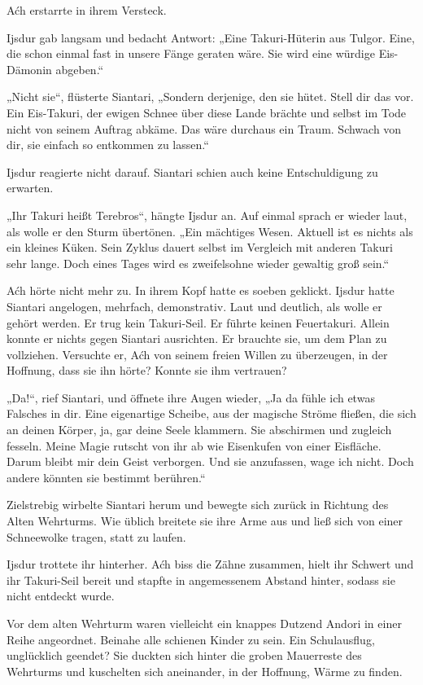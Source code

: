 Aćh erstarrte in ihrem Versteck.

Ijsdur gab langsam und bedacht Antwort: „Eine Takuri-Hüterin aus Tulgor. Eine, die schon einmal fast in unsere Fänge geraten wäre. Sie wird eine würdige Eis-Dämonin abgeben.“

„Nicht sie“, flüsterte Siantari, „Sondern derjenige, den sie hütet. Stell dir das vor. Ein Eis-Takuri, der ewigen Schnee über diese Lande brächte und selbst im Tode nicht von seinem Auftrag abkäme. Das wäre durchaus ein Traum. Schwach von dir, sie einfach so entkommen zu lassen.“

Ijsdur reagierte nicht darauf. Siantari schien auch keine Entschuldigung zu erwarten.

„Ihr Takuri heißt Terebros“, hängte Ijsdur an. Auf einmal sprach er wieder laut, als wolle er den Sturm übertönen. „Ein mächtiges Wesen. Aktuell ist es nichts als ein kleines Küken. Sein Zyklus dauert selbst im Vergleich mit anderen Takuri sehr lange. Doch eines Tages wird es zweifelsohne wieder gewaltig groß sein.“

Aćh hörte nicht mehr zu. In ihrem Kopf hatte es soeben geklickt. Ijsdur hatte Siantari angelogen, mehrfach, demonstrativ. Laut und deutlich, als wolle er gehört werden. Er trug kein Takuri-Seil. Er führte keinen Feuertakuri. Allein konnte er nichts gegen Siantari ausrichten. Er brauchte sie, um dem Plan zu vollziehen. Versuchte er, Aćh von seinem freien Willen zu überzeugen, in der Hoffnung, dass sie ihn hörte? Konnte sie ihm vertrauen?

„Da!“, rief Siantari, und öffnete ihre Augen wieder, „Ja da fühle ich etwas Falsches in dir. Eine eigenartige Scheibe, aus der magische Ströme fließen, die sich an deinen Körper, ja, gar deine Seele klammern. Sie abschirmen und zugleich fesseln. Meine Magie rutscht von ihr ab wie Eisenkufen von einer Eisfläche. Darum bleibt mir dein Geist verborgen. Und sie anzufassen, wage ich nicht. Doch andere könnten sie bestimmt berühren.“

Zielstrebig wirbelte Siantari herum und bewegte sich zurück in Richtung des Alten Wehrturms. Wie üblich breitete sie ihre Arme aus und ließ sich von einer Schneewolke tragen, statt zu laufen.

Ijsdur trottete ihr hinterher. Aćh biss die Zähne zusammen, hielt ihr Schwert und ihr Takuri-Seil bereit und stapfte in angemessenem Abstand hinter, sodass sie nicht entdeckt wurde.

Vor dem alten Wehrturm waren vielleicht ein knappes Dutzend Andori in einer Reihe angeordnet. Beinahe alle schienen Kinder zu sein. Ein Schulausflug, unglücklich geendet? Sie duckten sich hinter die groben Mauerreste des Wehrturms und kuschelten sich aneinander, in der Hoffnung, Wärme zu finden.


